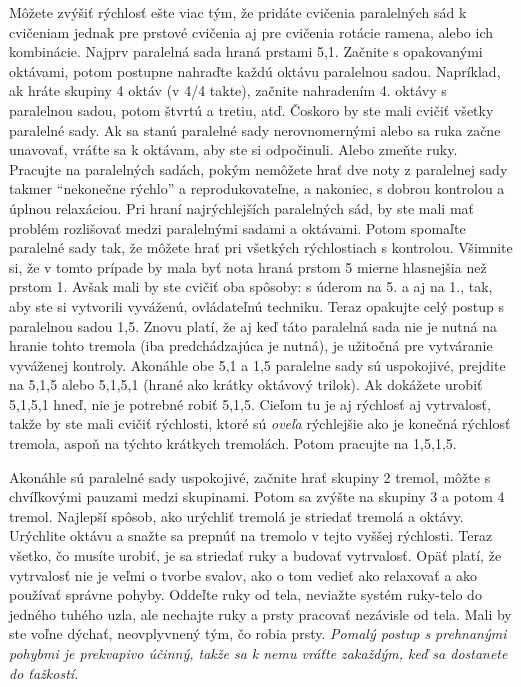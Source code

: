 Môžete zvýšiť rýchlosť ešte viac tým, že pridáte cvičenia paralelných sád k cvičeniam jednak pre prstové cvičenia aj pre cvičenia rotácie ramena, alebo ich kombinácie. Najprv paralelná sada hraná prstami 5,1. Začnite s opakovanými oktávami, potom postupne nahraďte každú oktávu paralelnou sadou. Napríklad, ak hráte skupiny 4 oktáv (v 4/4 takte), začnite nahradením 4. oktávy s paralelnou sadou, potom štvrtú a tretiu, atď. Čoskoro by ste mali cvičiť všetky paralelné sady. Ak sa stanú paralelné sady nerovnomernými alebo sa ruka začne unavovať, vráťte sa k oktávam, aby ste si odpočinuli. Alebo zmeňte ruky. Pracujte na paralelných sadách, pokým nemôžete hrať dve noty z paralelnej sady takmer “nekonečne rýchlo” a reprodukovateľne, a nakoniec, s dobrou kontrolou a úplnou relaxáciou. Pri hraní najrýchlejších paralelných sád, by ste mali mať problém rozlišovať medzi paralelnými sadami a oktávami. Potom spomaľte paralelné sady tak, že môžete hrať pri všetkých rýchlostiach s kontrolou. Všimnite si, že v tomto prípade by mala byť nota hraná prstom 5 mierne hlasnejšia než prstom 1. Avšak mali by ste cvičiť oba spôsoby: s úderom na 5. a aj na 1., tak, aby ste si vytvorili vyváženú, ovládateľnú techniku. Teraz opakujte celý postup s paralelnou sadou 1,5. Znovu platí, že aj keď táto paralelná sada nie je nutná na hranie tohto tremola (iba predchádzajúca je nutná), je užitočná pre vytváranie vyváženej kontroly. Akonáhle obe 5,1 a 1,5 paralelne sady sú uspokojivé, prejdite na 5,1,5 alebo 5,1,5,1 (hrané ako krátky oktávový trilok). Ak dokážete urobiť 5,1,5,1 hneď, nie je potrebné robiť 5,1,5. Cieľom tu je aj rýchlosť aj vytrvalosť, takže by ste mali cvičiť rýchlosti, ktoré sú \textit{oveľa} rýchlejšie ako je konečná rýchlosť tremola, aspoň na týchto krátkych tremolách. Potom pracujte na 1,5,1,5. 

Akonáhle sú paralelné sady uspokojivé, začnite hrať skupiny 2 tremol, môžte s chvíľkovými pauzami medzi skupinami. Potom sa zvýšte na skupiny 3 a potom 4 tremol. Najlepší spôsob, ako urýchliť tremolá je striedať tremolá a oktávy. Urýchlite oktávu a snažte sa prepnúť na tremolo v tejto vyššej rýchlosti. Teraz všetko, čo musíte urobiť, je sa striedať ruky a budovať vytrvalosť. Opäť platí, že vytrvalosť nie je veľmi o tvorbe svalov, ako o tom vedieť ako relaxovať a ako používať správne pohyby. Oddeľte ruky od tela, neviažte systém ruky-telo do jedného tuhého uzla, ale nechajte ruky a prsty pracovať nezávisle od tela. Mali by ste voľne dýchať, neovplyvnený tým, čo robia prsty. \emph{Pomalý postup s prehnanými pohybmi je prekvapivo účinný, takže sa k nemu vráťte zakaždým, keď sa dostanete do ťažkostí.}

